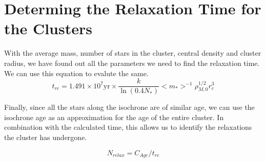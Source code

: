 \section{Determing the Relaxation Time for the Clusters}
With the average mass, number of stars in the cluster, central density and cluster radius, we have found out all the parameters we need to find the relaxation time. We can use this equation to evalute the same.
$$t_{rc} = 1.491 \times 10^7 \text{yr} \times \frac{k}{\ln(0.4 N_*)} <m_*>^{-1} \rho_{M, 0}^{1/2} r_c^3$$

Finally, since all the stars along the isochrone are of similar age, we can use the isochrone age as an approximation for the age of the entire cluster. In combination with the calculated time, this allows us to identify the relaxations the cluster has undergone.

$$N_{relax} = C_{Age}/t_{rc}$$
